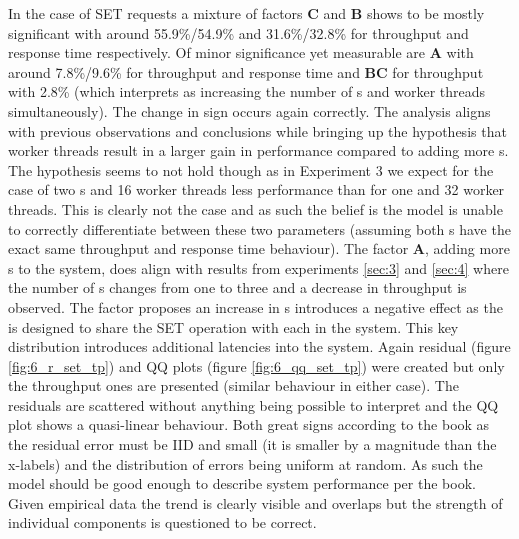     In the case of SET requests a mixture of factors \textbf{C} and \textbf{B} shows to be mostly significant with
    around 55.9\%/54.9\% and 31.6\%/32.8\% for throughput and response time respectively. Of minor significance yet
    measurable are \textbf{A} with around 7.8\%/9.6\% for throughput and response time and \textbf{BC} for
    throughput with 2.8\% (which interprets as increasing the number of \mw{}s and worker threads simultaneously).
    The change in sign occurs again correctly. The analysis aligns with previous observations and conclusions while
    bringing up the hypothesis that worker threads result in a larger gain in performance compared to adding more
    \mw{}s. The hypothesis seems to not hold though as in Experiment 3 we expect for the case of two \mw{}s and 16
    worker threads less performance than for one \mw{} and 32 worker threads. This is clearly not the case and as
    such the belief is the model is unable to correctly differentiate between these two parameters (assuming both
    \mw{}s have the exact same throughput and response time behaviour). The factor \textbf{A}, adding more \srv{}s to
    the system, does align with results from experiments \ref{sec:3} and \ref{sec:4} where the number of \srv{}s changes
    from one to three and a decrease in throughput is observed. The factor proposes an increase in \srv{}s introduces a
    negative effect as the \mw{} is designed to share the SET operation with each \srv{} in the system. This key
    distribution introduces additional latencies into the system. Again residual (figure \ref{fig:6_r_set_tp}) and QQ
    plots (figure \ref{fig:6_qq_set_tp}) were created but only the throughput ones are presented (similar behaviour in
    either case). The residuals are scattered without anything being possible to interpret and the QQ plot shows a
    quasi-linear behaviour. Both great signs according to the book as the residual error must be IID and small (it is
    smaller by a magnitude than the x-labels) and the distribution of errors being uniform at random. As such the model
    should be good enough to describe system performance per the book. Given empirical data the trend is clearly visible
    and overlaps but the strength of individual components is questioned to be correct.


